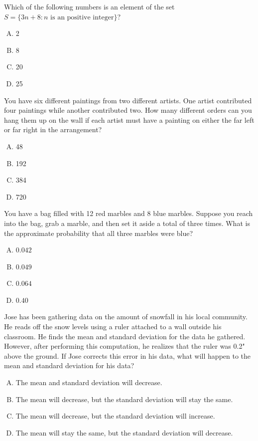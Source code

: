 \documentclass[12pt,letterpaper]{exam}
\begin{document}
\begin{questions}
\question Which of the following numbers is an element of the set $S= \{ 3n + 8 \colon n \text{ is an positive integer} \}$?
	\begin{enumerate}[A.]
	\item 2
	\item 8
	\item 20
	\item 25
	\end{enumerate}

\vfill

\question You have six different paintings from two different artists. One artist contributed four paintings while another contributed two. How many different orders can you hang them up on the wall if each artist must have a painting on either the far left or far right in the arrangement?
	\begin{enumerate}[A.]
	\item 48
	\item 192
	\item 384
	\item 720
	\end{enumerate}



\newpage
\vfill



\question You have a bag filled with 12 red marbles and 8 blue marbles. Suppose you reach into the bag, grab a marble, and then set it aside a total of three times. What is the approximate probability that all three marbles were blue?
	\begin{enumerate}[A.]
	\item $0.042$
	\item $0.049$
	\item $0.064$
	\item $0.40$
	\end{enumerate}

\vfill

\question Jose has been gathering data on the amount of snowfall in his local community. He reads off the snow levels using a ruler attached to a wall outside his classroom. He finds the mean and standard deviation for the data he gathered. However, after performing this computation, he realizes that the ruler was 0.2" above the ground. If Jose corrects this error in his data, what will happen to the mean and standard deviation for his data?
	\begin{enumerate}[A.]
	\item The mean and standard deviation will decrease.
	\item The mean will decrease, but the standard deviation will stay the same.
	\item The mean will decrease, but the standard deviation will increase.
	\item The mean will stay the same, but the standard deviation will decrease. 
	\end{enumerate}


\end{questions}
\end{document}
